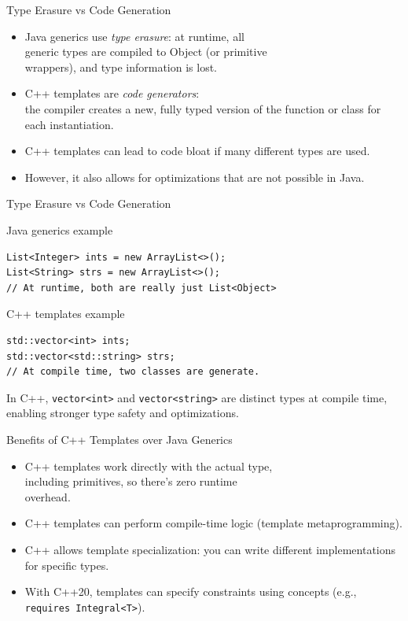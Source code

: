 \documentclass[14pt,aspectratio=1610, hyperref={pdfpagelayout=SinglePage}]{beamer}
\begin{document}
\begin{frame}{Type Erasure vs Code Generation}
\begin{itemize}
\item
  Java generics use \emph{type erasure}: at runtime, all\\
  generic types are compiled to Object (or primitive\\ wrappers), and type information is lost.
\item 
  C++ templates are \emph{code generators}:\\
  the compiler creates a new, fully typed version of the function or class for each instantiation.
\item
  C++ templates can lead to code bloat if many different types are used.
\item
  However, it also allows for optimizations that are not possible in Java.
\end{itemize}
\end{frame}

\begin{frame}[fragile]{Type Erasure vs Code Generation}

Java generics example
\begin{lstlisting}[basicstyle=\ttfamily\small]
List<Integer> ints = new ArrayList<>();
List<String> strs = new ArrayList<>();
// At runtime, both are really just List<Object>
\end{lstlisting}

C++ templates example
\begin{lstlisting}[basicstyle=\ttfamily\small]
std::vector<int> ints;
std::vector<std::string> strs;
// At compile time, two classes are generate.
\end{lstlisting}

In C++, \lstinline{vector<int>} and \lstinline{vector<string>} are distinct types at compile time, enabling stronger type safety and optimizations.
\end{frame}

\begin{frame}{Benefits of C++ Templates over Java Generics}
\begin{itemize}
\item C++ templates work directly with the actual type,\\ including primitives, so there's zero runtime\\ overhead.
\item C++ templates can perform compile-time logic (template metaprogramming).
\item C++ allows template specialization: you can write different implementations for specific types.
\item With C++20, templates can specify constraints using concepts (e.g., \lstinline{requires Integral<T>}).
\end{itemize}
\end{frame}
\end{document}

